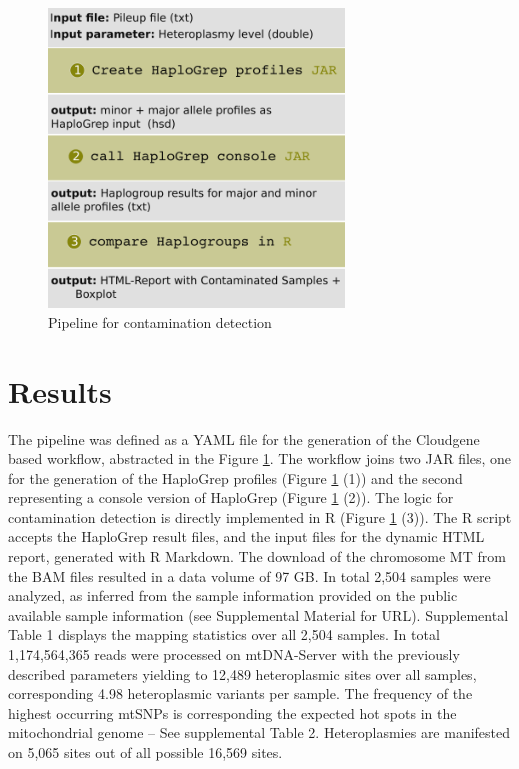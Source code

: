\begin{figure}[!ht]
    \centering
    \includegraphics[width=0.7\textwidth]{images/workflow_haplochecker.png}
    \caption[Pipeline for contamination detection]{Pipeline for contamination detection } 
    \label{cont:workflow}
\end{figure}

 
\section{Results}\label{cont:result}
The pipeline was defined as a YAML file for the generation of the Cloudgene based workflow, abstracted in the Figure \ref{cont:workflow}. The workflow joins two JAR files, one for the generation of the HaploGrep profiles (Figure \ref{cont:workflow} (1)) and the second representing a console version of HaploGrep (Figure \ref{cont:workflow} (2)). The logic for contamination detection is directly implemented in R (Figure \ref{cont:workflow} (3)). The R script accepts the HaploGrep result files, and the input files for the dynamic HTML report, generated with R Markdown. 
The download of the chromosome MT from the BAM files resulted in a data volume of 97 GB. In total 2,504 samples were analyzed, as inferred from the sample information provided on the public available sample information (see Supplemental Material for URL). Supplemental Table 1 displays the mapping statistics over all 2,504 samples. In total 1,174,564,365 reads were processed on mtDNA-Server with the previously described parameters yielding to 12,489 heteroplasmic sites over all samples, corresponding 4.98 heteroplasmic variants per sample. The frequency of the highest occurring mtSNPs is corresponding the expected hot spots in the mitochondrial genome – See supplemental Table 2. Heteroplasmies are manifested on 5,065 sites out of all possible 16,569 sites. 


